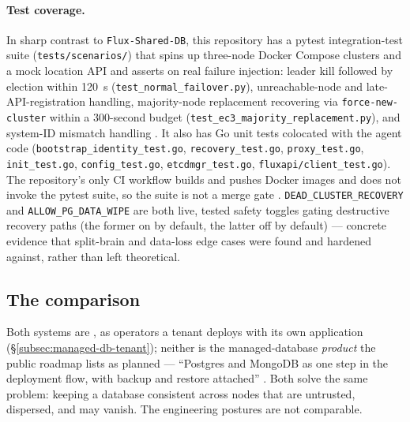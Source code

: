 \paragraph{Test coverage.} In sharp contrast to \texttt{Flux-Shared-DB}, this repository
has a pytest integration-test suite (\texttt{tests/\allowbreak{}scenarios/\allowbreak{}}) that spins up
three-node Docker Compose clusters and a mock \FluxOS location API and asserts on real
failure injection: leader kill followed by election within 120~s
(\texttt{test\_normal\_failover.\allowbreak{}py}), unreachable-node and late-API-registration
handling, majority-node replacement recovering via \texttt{force-\allowbreak{}new-\allowbreak{}cluster} within a
300-second budget (\texttt{test\_ec3\_majority\_replacement.\allowbreak{}py}), and system-ID
mismatch handling
. It also has Go unit tests colocated
with the agent code (\texttt{bootstrap\_identity\_test.\allowbreak{}go}, \texttt{recovery\_test.\allowbreak{}go},
\texttt{proxy\_test.go}, \texttt{init\_test.go}, \texttt{config\_test.\allowbreak{}go},
\texttt{etcdmgr\_test.\allowbreak{}go}, \texttt{fluxapi/\allowbreak{}client\_test.\allowbreak{}go}). The repository's only CI
workflow builds and pushes Docker images and does not invoke the pytest suite, so the
suite is not a merge gate
.
\texttt{DEAD\_CLUSTER\_RECOVERY} and \texttt{ALLOW\_PG\_DATA\_WIPE} are both live,
tested safety toggles gating destructive recovery paths (the former on by default, the
latter off by default)
 --- concrete evidence that
split-brain and data-loss edge cases were found and hardened against, rather than left
theoretical.

\subsection{The comparison}
\label{subsec:managed-db-comparison}

Both systems are \shipped, as operators a tenant deploys with its own application
(\S\ref{subsec:managed-db-tenant}); neither is the managed-database \emph{product} the public
roadmap lists as planned --- ``Postgres and MongoDB as one step in the deployment flow, with
backup and restore attached'' . Both
solve the same problem: keeping a database consistent
across nodes that are untrusted, dispersed, and may vanish. The engineering postures
are not comparable.

